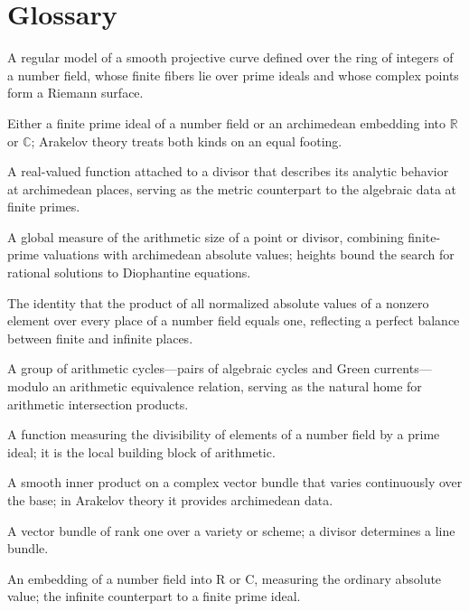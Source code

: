 \section*{Glossary}
\begin{description}[leftmargin=*,style=nextline,itemsep=0.3em]

\item[\textbf{Arithmetic surface.}] A regular model of a smooth projective curve defined over the ring of integers of a number field, whose finite fibers lie over prime ideals and whose complex points form a Riemann surface.

\item[\textbf{Place.}] Either a finite prime ideal of a number field or an archimedean embedding into $\mathbb R$ or $\mathbb C$; Arakelov theory treats both kinds on an equal footing.

\item[\textbf{Green function.}] A real-valued function attached to a divisor that describes its analytic behavior at archimedean places, serving as the metric counterpart to the algebraic data at finite primes.

\item[\textbf{Height.}] A global measure of the arithmetic size of a point or divisor, combining finite-prime valuations with archimedean absolute values; heights bound the search for rational solutions to Diophantine equations.

\item[\textbf{Product formula.}] The identity that the product of all normalized absolute values of a nonzero element over every place of a number field equals one, reflecting a perfect balance between finite and infinite places.

\item[\textbf{Arithmetic Chow group.}] A group of arithmetic cycles---pairs of algebraic cycles and Green currents---modulo an arithmetic equivalence relation, serving as the natural home for arithmetic intersection products.

\item[\textbf{Valuation.}] A function measuring the divisibility of elements of a number field by a prime ideal; it is the local building block of arithmetic.

\item[\textbf{Hermitian metric.}] A smooth inner product on a complex vector bundle that varies continuously over the base; in Arakelov theory it provides archimedean data.

\item[\textbf{Line bundle.}] A vector bundle of rank one over a variety or scheme; a divisor determines a line bundle.

\item[\textbf{Archimedean place.}] An embedding of a number field into R or C, measuring the ordinary absolute value; the infinite counterpart to a finite prime ideal.

\end{description}

